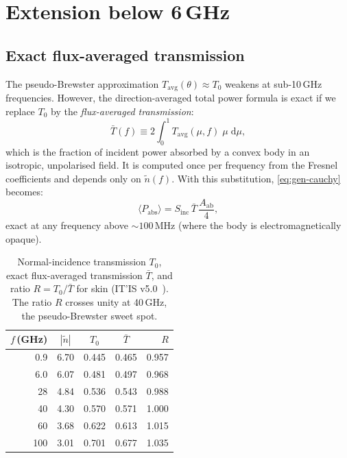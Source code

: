 \documentclass[11pt,a4paper]{article}
\theoremstyle{definition}
\newcommand{\Sinc}{S_{\mathrm{inc}}}
\newcommand{\Tavg}{T_{\mathrm{avg}}}
\newcommand{\Aab}{A_{\mathrm{ab}}}
\newcommand{\ntilde}{\tilde{n}}
\newcommand{\Tbar}{\bar{T}}
\newcommand{\diff}{\mathrm{d}}
\begin{document}
\section{Extension below 6\,GHz}\label{sec:sub6}

\subsection{Exact flux-averaged transmission}

The pseudo-Brewster approximation $\Tavg(\theta)\approx T_0$ weakens at
sub-10\,GHz frequencies.  However, the direction-averaged total power
formula is exact if we replace $T_0$ by the \emph{flux-averaged
transmission}:
\begin{equation}\label{eq:Tbar}
  \Tbar(f) \equiv 2\int_0^1 \Tavg(\mu,f)\;\mu\;\diff\mu,
\end{equation}
which is the fraction of incident power absorbed by a convex body in an
isotropic, unpolarised field.  It is computed once per frequency from
the Fresnel coefficients and depends only on $\ntilde(f)$.  With this
substitution, \cref{eq:gen-cauchy} becomes:
\begin{equation}\label{eq:Cauchy-exact}
  \boxed{\langle P_{\mathrm{abs}}\rangle = \Sinc\,\Tbar\,\frac{\Aab}{4},}
\end{equation}
exact at any frequency above ${\sim}100$\,MHz (where the body is
electromagnetically opaque).

\begin{table}[!htbp]
\centering
\caption{Normal-incidence transmission $T_0$, exact flux-averaged
  transmission $\Tbar$, and ratio $R=T_0/\Tbar$ for skin
  (IT'IS v5.0~\cite{ITISv5}).  The ratio $R$ crosses unity at
  40\,GHz, the pseudo-Brewster sweet spot.}\label{tab:Tbar}
\begin{tabular}{rcccr}
\toprule
$f$\,(GHz) & $|\ntilde|$ & $T_0$ & $\Tbar$ & $R$ \\
\midrule
  0.9 & 6.70 & 0.445 & 0.465 & 0.957 \\
  6.0 & 6.07 & 0.481 & 0.497 & 0.968 \\
 28   & 4.84 & 0.536 & 0.543 & 0.988 \\
 40   & 4.30 & 0.570 & 0.571 & 1.000 \\
 60   & 3.68 & 0.622 & 0.613 & 1.015 \\
100   & 3.01 & 0.701 & 0.677 & 1.035 \\
\bottomrule
\end{tabular}
\end{table}
\end{document}
